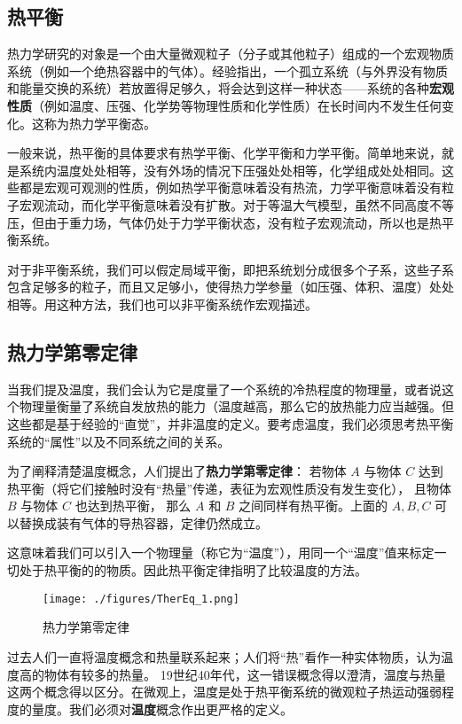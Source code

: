 
\begin{issues}
\issueDraft
\end{issues}

\subsection{热平衡}
热力学研究的对象是一个由大量微观粒子（分子或其他粒子）组成的一个宏观物质系统（例如一个绝热容器中的气体）。经验指出，一个孤立系统（与外界没有物质和能量交换的系统）若放置得足够久，将会达到这样一种状态——系统的各种\textbf{宏观性质}（例如温度、压强、化学势等物理性质和化学性质）在长时间内不发生任何变化。这称为热力学平衡态。

一般来说，热平衡的具体要求有热学平衡、化学平衡和力学平衡。简单地来说，就是系统内温度处处相等，没有外场的情况下压强处处相等，化学组成处处相同。这些都是宏观可观测的性质，例如热学平衡意味着没有热流，力学平衡意味着没有粒子宏观流动，而化学平衡意味着没有扩散。对于等温大气模型，虽然不同高度不等压，但由于重力场，气体仍处于力学平衡状态，没有粒子宏观流动，所以也是热平衡系统。

对于非平衡系统，我们可以假定局域平衡，即把系统划分成很多个子系，这些子系包含足够多的粒子，而且又足够小，使得热力学参量（如压强、体积、温度）处处相等。用这种方法，我们也可以非平衡系统作宏观描述。

\subsection{热力学第零定律}
当我们提及温度，我们会认为它是度量了一个系统的冷热程度的物理量，或者说这个物理量衡量了系统自发放热的能力（温度越高，那么它的放热能力应当越强。但这些都是基于经验的“直觉”，并非温度的定义。要考虑温度，我们必须思考热平衡系统的“属性”以及不同系统之间的关系。

为了阐释清楚温度概念，人们提出了\textbf{热力学第零定律}：
若物体 $A$ 与物体 $C$ 达到热平衡（将它们接触时没有“热量”传递，表征为宏观性质没有发生变化）， 且物体 $B$ 与物体 $C$ 也达到热平衡， 那么 $A$ 和 $B$ 之间同样有热平衡。上面的 $A,B,C$ 可以替换成装有气体的导热容器，定律仍然成立。

这意味着我们可以引入一个物理量（称它为“温度”），用同一个“温度”值来标定一切处于热平衡的的物质。因此热平衡定律指明了比较温度的方法。
\begin{figure}[ht]
\centering
\texttt{[image: ./figures/TherEq\_1.png]}
\caption{热力学第零定律} \label{TherEq_fig1}
\end{figure}

过去人们一直将温度概念和热量联系起来；人们将“热”看作一种实体物质，认为温度高的物体有较多的热量。 19世纪40年代，这一错误概念得以澄清，温度与热量这两个概念得以区分。在微观上，温度是处于热平衡系统的微观粒子热运动强弱程度的量度。我们必须对\textbf{温度}概念作出更严格的定义。

